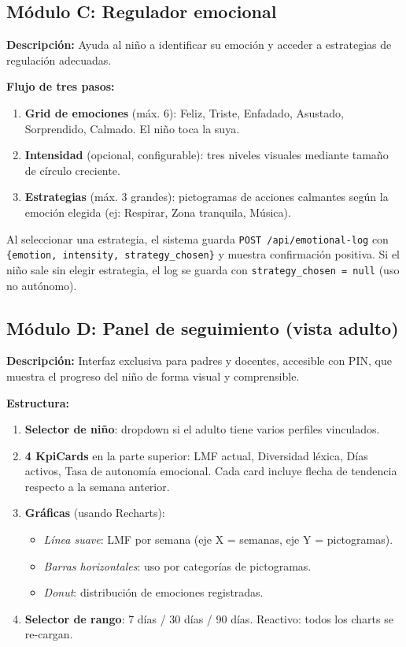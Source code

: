 \documentclass[12pt, a4paper]{article}
\begin{document}
\subsection{Módulo C: Regulador emocional}

\textbf{Descripción:} Ayuda al niño a identificar su emoción y acceder a estrategias de regulación adecuadas.

\textbf{Flujo de tres pasos:}

\begin{enumerate}
  \item \textbf{Grid de emociones} (máx. 6): Feliz, Triste, Enfadado, Asustado, Sorprendido, Calmado. El niño toca la suya.
  \item \textbf{Intensidad} (opcional, configurable): tres niveles visuales mediante tamaño de círculo creciente.
  \item \textbf{Estrategias} (máx. 3 grandes): pictogramas de acciones calmantes según la emoción elegida (ej: Respirar, Zona tranquila, Música).
\end{enumerate}

Al seleccionar una estrategia, el sistema guarda \texttt{POST /api/emotional-log} con \texttt{\{emotion, intensity, strategy\_chosen\}} y muestra confirmación positiva. Si el niño sale sin elegir estrategia, el log se guarda con \texttt{strategy\_chosen = null} (uso no autónomo).

\subsection{Módulo D: Panel de seguimiento (vista adulto)}

\textbf{Descripción:} Interfaz exclusiva para padres y docentes, accesible con PIN, que muestra el progreso del niño de forma visual y comprensible.

\textbf{Estructura:}

\begin{enumerate}
  \item \textbf{Selector de niño}: dropdown si el adulto tiene varios perfiles vinculados.
  \item \textbf{4 KpiCards} en la parte superior: LMF actual, Diversidad léxica, Días activos, Tasa de autonomía emocional. Cada card incluye flecha de tendencia respecto a la semana anterior.
  \item \textbf{Gráficas} (usando Recharts):
    \begin{itemize}
      \item \emph{Línea suave}: LMF por semana (eje X = semanas, eje Y = pictogramas).
      \item \emph{Barras horizontales}: uso por categorías de pictogramas.
      \item \emph{Donut}: distribución de emociones registradas.
    \end{itemize}
  \item \textbf{Selector de rango}: 7 días / 30 días / 90 días. Reactivo: todos los charts se re-cargan.
\end{enumerate}
\end{document}
